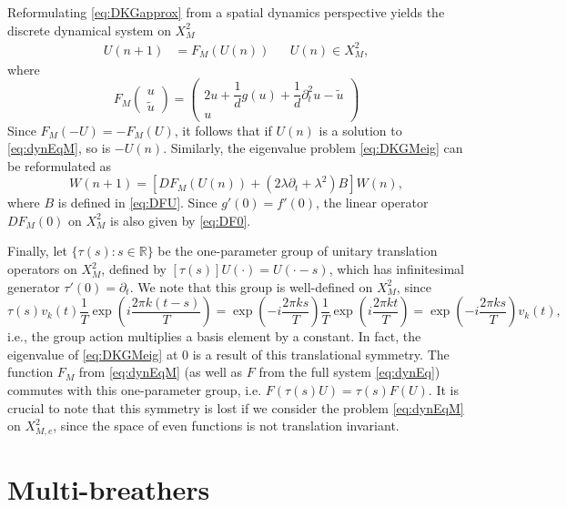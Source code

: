 \documentclass[12pt,reqno]{amsart}
\def\R{{\mathbb R}}
\theoremstyle{definition}
\begin{document}
Reformulating \cref{eq:DKGapprox} from a spatial dynamics perspective yields the discrete dynamical system on $X_M^2$
\begin{align}\label{eq:dynEqM}
U(n+1) &= F_M(U(n)) && U(n) \in X_M^2,
\end{align}
where
\begin{equation}\label{eq:FM}
F_M\begin{pmatrix}u \\ \tilde{u} \end{pmatrix} = 
\begin{pmatrix}2u  + \dfrac{1}{d}g(u) + \dfrac{1}{d} \partial_t^2 u - \tilde{u} \\
u
\end{pmatrix}
\end{equation}
Since $F_M(-U) = -F_M(U)$, it follows that if $U(n)$ is a solution to \cref{eq:dynEqM}, so is $-U(n)$. Similarly, the eigenvalue problem \cref{eq:DKGMeig} can be reformulated as
\begin{equation}\label{eq:dynEVPM}
W(n+1) = \left[ DF_M(U(n)) + (2 \lambda \partial_t + \lambda^2) B \right] W(n),
\end{equation}
where $B$ is defined in \cref{eq:DFU}. Since $g'(0) = f'(0)$, the linear operator $DF_M(0)$ on $X_M^2$ is also given by \cref{eq:DF0}. 

Finally, let $\{\tau(s) : s \in \R\}$ be the one-parameter group of unitary translation operators on $X_M^2$, defined by $[\tau(s)]U(\cdot) = U(\cdot - s)$, which has infinitesimal generator $\tau'(0) = \partial_t$. We note that this group is well-defined on $X_M^2$, since 
\[
\tau(s) v_k(t) 
\frac{1}{T} \exp\left( i \frac{2 \pi k (t-s)}{T}\right) 
= \exp\left( -i \frac{2 \pi k s}{T} \right) \frac{1}{T} \exp\left( i \frac{2 \pi k t}{T}\right) 
= \exp\left( -i \frac{2 \pi k s}{T} \right) v_k(t),
\]
i.e., the group action multiplies a basis element by a constant. In fact, the eigenvalue of \cref{eq:DKGMeig} at 0 is a result of this translational symmetry. The function $F_M$ from \cref{eq:dynEqM} (as well as $F$ from the full system \cref{eq:dynEq}) commutes with this one-parameter group, i.e. $F(\tau(s) U) = \tau(s) F(U)$. It is crucial to note that this symmetry is lost if we consider the problem \cref{eq:dynEqM} on $X_{M,e}^2$, since the space of even functions is not translation invariant. 

\section{Multi-breathers}\label{sec:multi}
\end{document}
